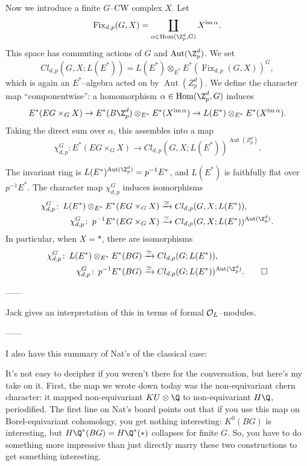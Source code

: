 Now we introduce a finite $G$--CW complex $X$.  Let \[\operatorname{Fix}_{d, p}(G, X) = \coprod_{\alpha \in \operatorname{Hom}(\Z_p^d, G)} X^{\operatorname{im} \alpha}.\]  This space has commuting actions of $G$ and $\operatorname{Aut}(\Z_p^d)$.  We set \[Cl_{d, p}(G, X; L(E^*)) = L(E^*) \otimes_{E^*} E^*(\operatorname{Fix}_{d,p}(G, X))^G,\] which is again an $E^*$--algebra acted on by $\operatorname{Aut}(Z_p^d)$.  We define the character map ``componentwise'': a homomorphism $\alpha \in \operatorname{Hom}(\Z_p^d, G)$ induces \[E^*(EG \times_G X) \to E^*(B\Z_p^d) \otimes_{E^*} E^*(X^{\operatorname{im} \alpha}) \to L(E^*) \otimes_{E^*} E^*(X^{\operatorname{im} \alpha}).\]  Taking the direct sum over $\alpha$, this assembles into a map \[\chi_{d,p}^G: E^*(EG \times_G X) \to Cl_{d,p}(G, X; L(E^*))^{\operatorname{Aut}(Z_p^d)}.\]
\begin{theorem}
The invariant ring is $L(E^*)^{\operatorname{Aut}(\Z_p^d)} = p^{-1} E^*$, and $L(E^*)$ is faithfully flat over $p^{-1} E^*$.  The character map $\chi_{d,p}^G$ induces isomorphisms
\begin{align*}
\chi_{d,p}^G \co L(E^*) \otimes_{E^*} E^*(EG \times_G X) & \xrightarrow{\simeq} Cl_{d,p}(G, X; L(E^*)), \\
\chi_{d,p}^G \co p^{-1} E^*(EG \times_G X) & \xrightarrow{\simeq} Cl_{d,p}(G, X; L(E^*))^{\operatorname{Aut}(\Z_p^d)}.
\end{align*}
In particular, when $X = *$, there are isomorphisms
\begin{align*}
\chi_{d,p}^G \co L(E^*) \otimes_{E^*} E^*(BG) & \xrightarrow{\simeq} Cl_{d,p}(G; L(E^*)), \\
\chi_{d,p}^G \co p^{-1} E^*(BG) & \xrightarrow{\simeq} Cl_{d,p}(G; L(E^*))^{\operatorname{Aut}(\Z_p^d)}. \qed
\end{align*}
\end{theorem}

------

Jack gives an interpretation of this in terms of formal $\mathcal{O}_L$--modules.

------

I also have this summary of Nat's of the classical case:

It's not easy to decipher if you weren't there for the conversation, but here's my take on it. First, the map we wrote down today was the non-equivariant chern character: it mapped non-equivariant $KU \otimes \Q$ to non-equivariant $H\Q$, periodified. The first line on Nat's board points out that if you use this map on Borel-equivariant cohomology, you get nothing interesting: $K^0(BG)$ is interesting, but $H\Q^*(BG) = H\Q^*(*)$ collapses for finite $G$. So, you have to do something more impressive than just directly marry these two constructions to get something interesting.

